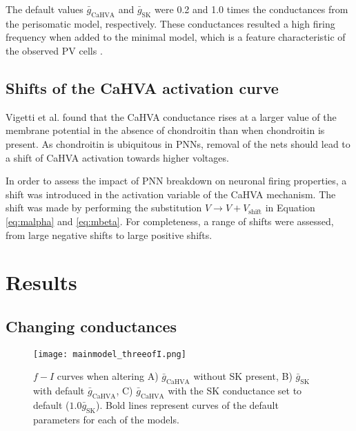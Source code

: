 \documentclass[times, twoside]{zHenriquesLab-StyleBioRxiv}
\begin{document}
The default values $\bar{g}_\text{CaHVA}$ and $\bar{g}_\text{SK}$ were 0.2 and 1.0 times the conductances from the perisomatic model, respectively. These conductances resulted a high firing frequency when added to the minimal model, which is a feature characteristic of the observed PV cells \cite{tewari_perineuronal_2018,lensjo_removal_2017}.


\subsection*{Shifts of the CaHVA activation curve}
Vigetti et al. \cite{vigetti_chondroitin_2008} found that the CaHVA conductance rises at a larger value of the membrane potential in the absence of chondroitin than when chondroitin is present. As chondroitin is ubiquitous in PNNs, removal of the nets should lead to a shift of CaHVA activation towards higher voltages. %

In order to assess the impact of PNN breakdown on neuronal firing properties, a shift was introduced in the activation variable of the CaHVA mechanism. The shift was made by performing the substitution $V\rightarrow V+V_\text{shift}$ in Equation \ref{eq:malpha} and \ref{eq:mbeta}. For completeness, a range of shifts were assessed, from large negative shifts to large positive shifts.


\section*{Results}

\subsection*{Changing conductances}

\begin{figure*}
\centering
\texttt{[image: mainmodel\_threeofI.png]}
\caption{$f-I$ curves when altering A) $\bar{g}_\text{CaHVA}$ without SK present, B) $\bar{g}_\text{SK}$ with default $\bar{g}_\text{CaHVA}$, C) $\bar{g}_\text{CaHVA}$ with the SK conductance set to default ($1.0\bar{g}_\text{SK}$). Bold lines represent curves of the default parameters for each of the models.}
\label{fig:fI_hjortbase_cahva_sk}
\end{figure*}
\end{document}
